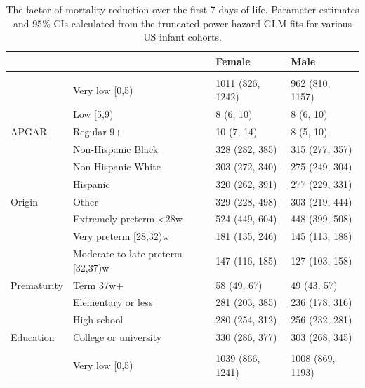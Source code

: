 \documentclass[10pt, twoside, parskip=half]{article}
\begin{document}
\begin{table}[t]

\caption{\label{tab:tab-ci-M}The factor of mortality reduction over the first 7 days of life. Parameter estimates and $95\%$ CIs calculated from the truncated-power hazard GLM fits for various US infant cohorts.}
\centering
\begin{tabular}{llll}
\toprule
\textbf{} & \textbf{} & \textbf{Female} & \textbf{Male}\\
\midrule
\addlinespace[0.3em]
\multicolumn{4}{l}{\textbf{1995-1999}}\\
 & Very low [0,5) & 1011 (826, 1242) & 962 (810, 1157)\\

 & Low [5,9) & 8 (6, 10) & 8 (6, 10)\\

\multirow{-3}{*}{\raggedright\arraybackslash \hspace{1em}APGAR} & Regular 9+ & 10 (7, 14) & 8 (5, 10)\\
\cmidrule{1-4}
 & Non-Hispanic Black & 328 (282, 385) & 315 (277, 357)\\

 & Non-Hispanic White & 303 (272, 340) & 275 (249, 304)\\

 & Hispanic & 320 (262, 391) & 277 (229, 331)\\

\multirow{-4}{*}{\raggedright\arraybackslash \hspace{1em}Origin} & Other & 329 (228, 498) & 303 (219, 444)\\
\cmidrule{1-4}
 & Extremely preterm <28w & 524 (449, 604) & 448 (399, 508)\\

 & Very preterm [28,32)w & 181 (135, 246) & 145 (113, 188)\\

 & Moderate to late preterm [32,37)w & 147 (116, 185) & 127 (103, 158)\\

\multirow{-4}{*}{\raggedright\arraybackslash \hspace{1em}Prematurity} & Term 37w+ & 58 (49, 67) & 49 (43, 57)\\
\cmidrule{1-4}
 & Elementary or less & 281 (203, 385) & 236 (178, 316)\\

 & High school & 280 (254, 312) & 256 (232, 281)\\

\multirow{-3}{*}{\raggedright\arraybackslash \hspace{1em}Education} & College or university & 330 (286, 377) & 303 (268, 345)\\
\cmidrule{1-4}
\addlinespace[0.3em]
\multicolumn{4}{l}{\textbf{2000-2005}}\\
 & Very low [0,5) & 1039 (866, 1241) & 1008 (869, 1193)\\


\end{tabular}
\end{table}
\end{document}
